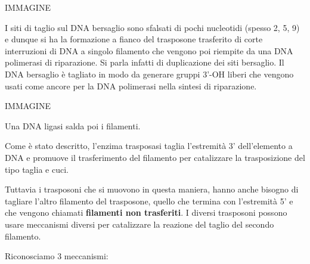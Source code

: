 \documentclass[]{article}
\begin{document}
IMMAGINE

I siti di taglio sul DNA bersaglio sono sfalsati di pochi nucleotidi
(spesso 2, 5, 9) e dunque si ha la formazione a fianco del trasposone
trasferito di corte interruzioni di DNA a singolo filamento che vengono
poi riempite da una DNA polimerasi di riparazione. Si parla infatti di
duplicazione dei siti bersaglio. Il DNA bersaglio è tagliato in modo da
generare gruppi 3'-OH liberi che vengono usati come ancore per la DNA
polimerasi nella sintesi di riparazione.

IMMAGINE

Una DNA ligasi salda poi i filamenti.

Come è stato descritto, l'enzima trasposasi taglia l'estremità 3'
dell'elemento a DNA e promuove il trasferimento del filamento per
catalizzare la trasposizione del tipo taglia e cuci.

Tuttavia i trasposoni che si muovono in questa maniera, hanno anche
bisogno di tagliare l'altro filamento del trasposone, quello che termina
con l'estremità 5' e che vengono chiamati \textbf{filamenti non
trasferiti}. I diversi trasposoni possono usare meccanismi diversi per
catalizzare la reazione del taglio del secondo filamento.

Riconosciamo 3 meccanismi:
\end{document}
